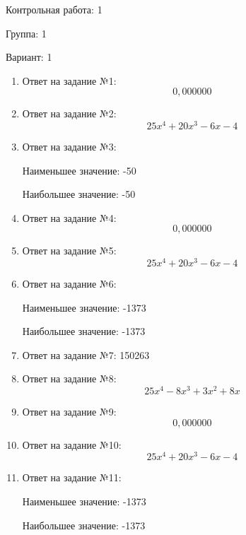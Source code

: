 \documentclass{article}
\begin{document}
Контрольная работа: 1

Группа: 1

Вариант: 1

\begin{enumerate}
\item Ответ на задание №1: \[0,000000
\]

\item Ответ на задание №2: \[25x^4 + 20x^3 - 6x - 4 \]

\item Ответ на задание №3: 

Наименьшее значение: -50

Наибольшее значение: -50

\item Ответ на задание №4: \[0,000000
\]

\item Ответ на задание №5: \[25x^4 + 20x^3 - 6x - 4 \]

\item Ответ на задание №6: 

Наименьшее значение: -1373

Наибольшее значение: -1373

\item Ответ на задание №7: 150263

\item Ответ на задание №8: \[25x^4 - 8x^3 + 3x^2 + 8x \]

\item Ответ на задание №9: \[0,000000
\]

\item Ответ на задание №10: \[25x^4 + 20x^3 - 6x - 4 \]

\item Ответ на задание №11: 

Наименьшее значение: -1373

Наибольшее значение: -1373

\end{enumerate}
\end{document}
